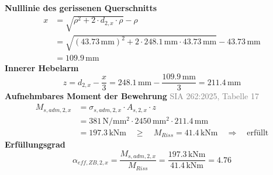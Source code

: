 \documentclass[11pt,a4paper]{article}
\newcommand{\normref}[1]{{\small\textcolor{gray}{#1}}}
\begin{document}
\noindent\textbf{Nulllinie des gerissenen Querschnitts}
\begin{equation*}
\begin{aligned}
  x &= \sqrt{\rho^{2} + 2 \cdot d_{2,x} \cdot \rho} - \rho \\
  &= \sqrt{\left(43.73\,\mathrm{mm}\right)^{2} + 2 \cdot 248.1\,\mathrm{mm} \cdot 43.73\,\mathrm{mm}} - 43.73\,\mathrm{mm} \\
  &= 109.9\,\mathrm{mm}
\end{aligned}
\end{equation*}
\noindent\textbf{Innerer Hebelarm}
\begin{equation*}
z = d_{2,x} - \frac{x}{3} = 248.1\,\mathrm{mm} - \frac{109.9\,\mathrm{mm}}{3} = 211.4\,\mathrm{mm}
\end{equation*}
\noindent\textbf{Aufnehmbares Moment der Bewehrung} \hfill \normref{SIA 262:2025, Tabelle 17}
\begin{equation*}
\begin{aligned}
  M_{s,adm,2,x} &= \sigma_{s,adm,2,x} \cdot A_{s,2,x} \cdot z \\
  &= 381\,\mathrm{N}/\mathrm{mm}^{2} \cdot 2450\,\mathrm{mm}^{2} \cdot 211.4\,\mathrm{mm} \\
  &= 197.3\,\mathrm{kNm} \quad \ge \quad M_{Riss} = 41.4\,\mathrm{kNm} \quad \Rightarrow \quad \text{erfüllt}
\end{aligned}
\end{equation*}
\noindent\textbf{Erfüllungsgrad}
\begin{equation*}
\alpha_{eff,ZB,2,x} = \frac{M_{s,adm,2,x}}{M_{Riss}} = \frac{197.3\,\mathrm{kNm}}{41.4\,\mathrm{kNm}} = 4.76
\end{equation*}
\end{document}
